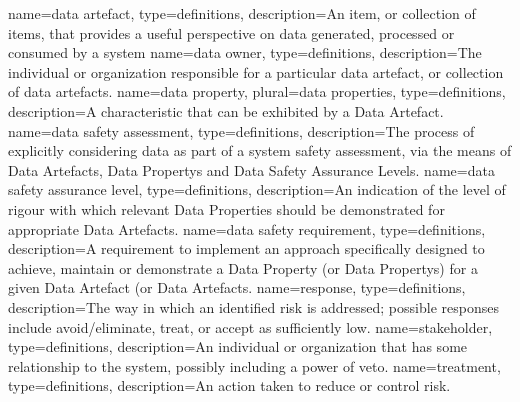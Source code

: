 
{name=data artefact,
	type=definitions,
	description={An item, or collection of items, that provides a useful perspective on data generated, processed or consumed by a system}}
{name=data owner,
	type=definitions,
	description={The individual or organization responsible for a particular data artefact, or collection of data artefacts.}}
{name=data property,
	plural=data properties,
	type=definitions,
	description={A characteristic that can be exhibited by a \gls{Data Artefact}.}}
{name=data safety assessment,
	type=definitions,
	description={The process of explicitly considering data as part of a system safety assessment, via the means of \glspl{Data Artefact}, \glspl{Data Property} and \glspl{Data Safety Assurance Level}.}}
{name=data safety assurance level,
	type=definitions,
	description={An indication of the level of rigour with which relevant Data Properties should be demonstrated for appropriate \glspl{Data Artefact}.}}
{name=data safety requirement,
	type=definitions,
	description={A requirement to implement an approach specifically designed to achieve, maintain or demonstrate a \gls{Data Property} (or \glspl{Data Property}) for a given \gls{Data Artefact} (or \glspl{Data Artefact}.}}
{name=response,
	type=definitions,
	description={The way in which an identified risk is addressed; possible responses include avoid/eliminate, treat, or accept as sufficiently low.}}
{name=stakeholder,
	type=definitions,
	description={An individual or organization that has some relationship to the system, possibly including a power of veto.}}
{name=treatment,
	type=definitions,
	description={An action taken to reduce or control risk.}}

